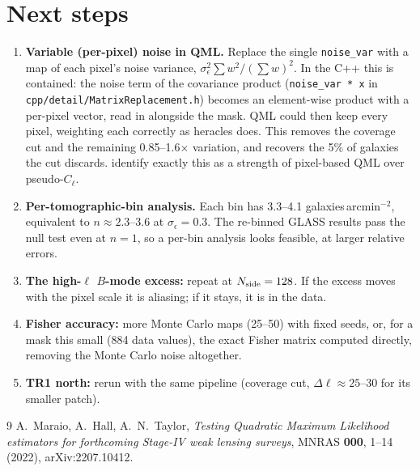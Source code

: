 \documentclass[11pt]{article}
\begin{document}
\section{Next steps}
\label{sec:next}
\begin{enumerate}
\item \textbf{Variable (per-pixel) noise in QML.} Replace the single \texttt{noise\_var} with a map of each pixel's
noise variance, $\sigma_\epsilon^2\sum w^2/(\sum w)^2$. In the C++ this is contained: the noise term of the
covariance product (\texttt{noise\_var * x} in \texttt{cpp/detail/MatrixReplacement.h}) becomes an element-wise
product with a per-pixel vector, read in alongside the mask. QML could then keep every pixel, weighting each
correctly as heracles does. This removes the coverage cut and the remaining 0.85--1.6$\times$ variation, and
recovers the 5\% of galaxies the cut discards. \citet{Maraio2022} identify exactly this as a strength of pixel-based
QML over pseudo-$C_\ell$.
\item \textbf{Per-tomographic-bin analysis.} Each bin has 3.3--4.1 galaxies\,arcmin$^{-2}$, equivalent to
$n\approx2.3$--3.6 at $\sigma_\epsilon=0.3$. The re-binned GLASS results pass the null test even at $n=1$, so a
per-bin analysis looks feasible, at larger relative errors.
\item \textbf{The high-$\ell$ $B$-mode excess:} repeat at $N_{\rm side}=128$. If the excess moves with the pixel
scale it is aliasing; if it stays, it is in the data.
\item \textbf{Fisher accuracy:} more Monte Carlo maps (25--50) with fixed seeds, or, for a mask this small (884 data
values), the exact Fisher matrix computed directly, removing the Monte Carlo noise altogether.
\item \textbf{TR1 north:} rerun with the same pipeline (coverage cut, $\Delta\ell\approx25$--30 for its smaller patch).
\end{enumerate}

\begin{thebibliography}{9}
A.~Maraio, A.~Hall, A.~N.~Taylor,
\emph{Testing Quadratic Maximum Likelihood estimators for forthcoming Stage-IV weak lensing surveys},
MNRAS \textbf{000}, 1--14 (2022), arXiv:2207.10412.
\end{thebibliography}
\end{document}
